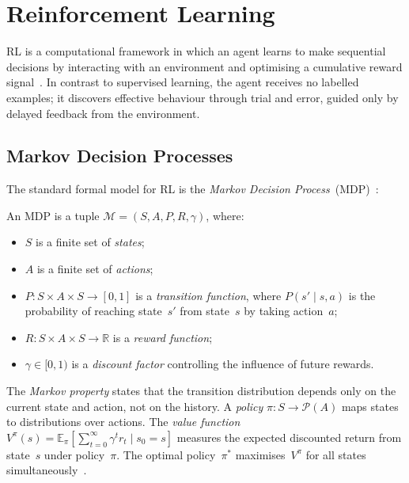 \section{Reinforcement Learning}
\label{sec:rl}

\ac{RL} is a computational framework in which an agent
learns to make sequential decisions by interacting with an environment and
optimising a cumulative reward
signal~\cite{Sutton2018ReinforcementIntroduction}.  In contrast to supervised
learning, the agent receives no labelled examples; it discovers effective
behaviour through trial and error, guided only by delayed feedback from the
environment.

\subsection{Markov Decision Processes}
\label{sec:mdp}

The standard formal model for RL is the \emph{Markov Decision
Process}~(MDP)~\cite{Huang2011ReinforcementManagement,Alshiekh2017SafeShielding}:

\begin{definition}[\ac{MDP}]
\label{def:mdp}
An MDP is a tuple $\mathcal{M} = (S, A, P, R, \gamma)$, where:
\begin{itemize}
  \item $S$ is a finite set of \emph{states};
  \item $A$ is a finite set of \emph{actions};
  \item $P : S \times A \times S \to [0,1]$ is a \emph{transition function},
    where $P(s' \mid s,a)$ is the probability of reaching state~$s'$ from
    state~$s$ by taking action~$a$;
  \item $R : S \times A \times S \to \mathbb{R}$ is a \emph{reward function};
  \item $\gamma \in [0,1)$ is a \emph{discount factor} controlling the
    influence of future rewards.
\end{itemize}
\end{definition}

The \emph{Markov property} states that the transition distribution depends only
on the current state and action, not on the history.  A \emph{policy}
$\pi : S \to \mathcal{P}(A)$ maps states to distributions over actions.  The
\emph{value function}
$V^\pi(s) = \mathbb{E}_\pi\!\left[\sum_{t=0}^{\infty} \gamma^t r_t \mid
s_0=s\right]$
measures the expected discounted return from state~$s$ under policy~$\pi$.  The
optimal policy~$\pi^*$ maximises~$V^\pi$ for all states
simultaneously~\cite{Sutton2018ReinforcementIntroduction}.

